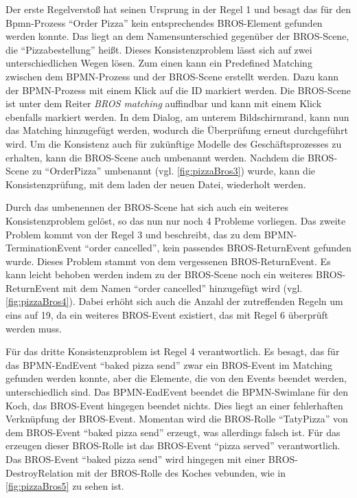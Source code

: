 Der erste Regelverstoß hat seinen Ursprung in der Regel 1 und besagt das für den Bpmn-Prozess ``Order Pizza'' kein entsprechendes BROS-Element gefunden werden konnte.
Das liegt an dem Namensunterschied gegenüber der BROS-Scene, die ``Pizzabestellung'' heißt.
Dieses Konsistenzproblem lässt sich auf zwei unterschiedlichen Wegen lösen.
Zum einen kann ein Predefined Matching zwischen dem BPMN-Prozess und der BROS-Scene erstellt werden.
Dazu kann der BPMN-Prozess mit einem Klick auf die ID markiert werden.
Die BROS-Scene ist unter dem Reiter \emph{BROS matching} auffindbar und kann mit einem Klick ebenfalls markiert werden.
In dem Dialog, am unterem Bildschirmrand, kann nun das Matching hinzugefügt werden, wodurch die Überprüfung erneut durchgeführt wird.
Um die Konsistenz auch für zukünftige Modelle des Geschäftsprozesses zu erhalten, kann die BROS-Scene auch umbenannt werden.
Nachdem die BROS-Scene zu ``OrderPizza'' umbenannt (vgl. \cref{fig:pizzaBros3}) wurde, kann die Konsistenzprüfung, mit dem laden der neuen Datei, wiederholt werden.

Durch das umbenennen der BROS-Scene hat sich auch ein weiteres Konsistenzproblem gelöst, so das nun nur noch 4 Probleme vorliegen.
Das zweite Problem kommt von der Regel 3 und beschreibt, das zu dem BPMN-TerminationEvent ``order cancelled'', kein passendes BROS-ReturnEvent gefunden wurde.
Dieses Problem stammt von dem vergessenen BROS-ReturnEvent.
Es kann leicht behoben werden indem zu der BROS-Scene noch ein weiteres BROS-ReturnEvent mit dem Namen ``order cancelled'' hinzugefügt wird (vgl. \cref{fig:pizzaBros4}). 
Dabei erhöht sich auch die Anzahl der zutreffenden Regeln um eins auf 19, da ein weiteres BROS-Event existiert, das mit Regel 6 überprüft werden muss.

Für das dritte Konsistenzproblem ist Regel 4 verantwortlich.
Es besagt, das für das BPMN-EndEvent ``baked pizza send'' zwar ein BROS-Event im Matching gefunden werden konnte, aber die Elemente, die von den Events beendet werden, unterschiedlich sind.
Das BPMN-EndEvent beendet die BPMN-Swimlane für den Koch, das BROS-Event hingegen beendet nichts.
Dies liegt an einer fehlerhaften Verknüpfung der BROS-Event.
Momentan wird die BROS-Rolle ``TatyPizza'' von dem BROS-Event ``baked pizza send'' erzeugt, was allerdings falsch ist.
Für das erzeugen dieser BROS-Rolle ist das BROS-Event ``pizza served'' verantwortlich.
Das BROS-Event ``baked pizza send'' wird hingegen mit einer BROS-DestroyRelation mit der BROS-Rolle des Koches vebunden, wie in \cref{fig:pizzaBros5} zu sehen ist.

